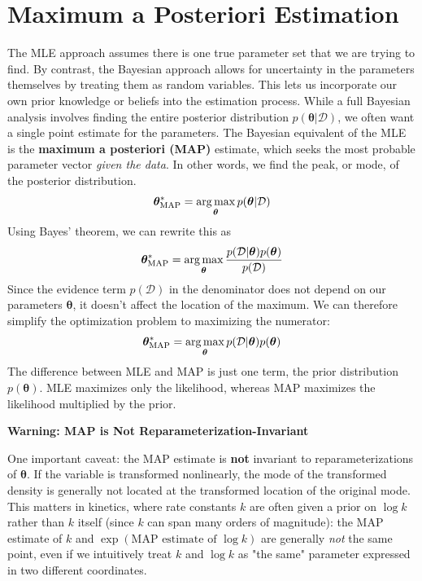 \section{Maximum a Posteriori Estimation}
The MLE approach assumes there is one true parameter set that we are trying to find. By contrast, the Bayesian approach allows for uncertainty in the parameters themselves by treating them as random variables. This lets us incorporate our own prior knowledge or beliefs into the estimation process. While a full Bayesian analysis involves finding the entire posterior distribution $p(\boldsymbol{\theta}|\mathcal{D})$, we often want a single point estimate for the parameters. The Bayesian equivalent of the MLE is the \textbf{maximum a posteriori (MAP)} estimate, which seeks the most probable parameter vector \textit{given the data}. In other words, we find the peak, or mode, of the posterior distribution.
\begin{equation}
    \boldsymbol{\theta}_{\text{MAP}}^* = \operatorname*{arg\,max}_{\boldsymbol{\theta}} p(\boldsymbol{\theta}|\mathcal{D})
\end{equation}
Using Bayes' theorem, we can rewrite this as
\begin{equation}
    \boldsymbol{\theta}_{\text{MAP}}^* = \operatorname*{arg\,max}_{\boldsymbol{\theta}} \frac{p(\mathcal{D}|\boldsymbol{\theta})p(\boldsymbol{\theta})}{p(\mathcal{D})}
\end{equation}
Since the evidence term $p(\mathcal{D})$ in the denominator does not depend on our parameters $\boldsymbol{\theta}$, it doesn't affect the location of the maximum. We can therefore simplify the optimization problem to maximizing the numerator:
\begin{equation}
    \boldsymbol{\theta}_{\text{MAP}}^* = \operatorname*{arg\,max}_{\boldsymbol{\theta}} p(\mathcal{D}|\boldsymbol{\theta})p(\boldsymbol{\theta})
\end{equation}
The difference between MLE and MAP is just one term, the prior distribution $p(\boldsymbol{\theta})$. MLE maximizes only the likelihood, whereas MAP maximizes the likelihood multiplied by the prior.

\begin{warningBox}
\textbf{Warning: MAP is Not Reparameterization-Invariant}

One important caveat: the MAP estimate is \textbf{not} invariant to reparameterizations of $\boldsymbol{\theta}$. If the variable is transformed nonlinearly, the mode of the transformed density is generally not located at the transformed location of the original mode. This matters in kinetics, where rate constants $k$ are often given a prior on $\log k$ rather than $k$ itself (since $k$ can span many orders of magnitude): the MAP estimate of $k$ and $\exp(\text{MAP estimate of } \log k)$ are generally \textit{not} the same point, even if we intuitively treat $k$ and $\log k$ as "the same" parameter expressed in two different coordinates.
\end{warningBox}

